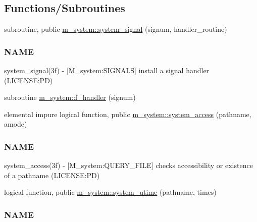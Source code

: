\subsection*{Functions/\+Subroutines}
\begin{DoxyCompactItemize}
\item 
subroutine, public \mbox{\hyperlink{namespacem__system_a4a70cade424b9763dedd8cb8c0059e8c}{m\+\_\+system\+::system\+\_\+signal}} (signum, handler\+\_\+routine)
\begin{DoxyCompactList}\small\item\em \subsubsection*{N\+A\+ME}

system\+\_\+signal(3f) -\/ \mbox{[}M\+\_\+system\+:S\+I\+G\+N\+A\+LS\mbox{]} install a signal handler (L\+I\+C\+E\+N\+SE\+:PD) \end{DoxyCompactList}\item 
subroutine \mbox{\hyperlink{namespacem__system_a078c9adfb12b36e88534248e99ed9fcc}{m\+\_\+system\+::f\+\_\+handler}} (signum)
\item 
elemental impure logical function, public \mbox{\hyperlink{namespacem__system_a4c1c906730e61629a8277e1daeda90f6}{m\+\_\+system\+::system\+\_\+access}} (pathname, amode)
\begin{DoxyCompactList}\small\item\em \subsubsection*{N\+A\+ME}

system\+\_\+access(3f) -\/ \mbox{[}M\+\_\+system\+:Q\+U\+E\+R\+Y\+\_\+\+F\+I\+LE\mbox{]} checks accessibility or existence of a pathname (L\+I\+C\+E\+N\+SE\+:PD) \end{DoxyCompactList}\item 
logical function, public \mbox{\hyperlink{namespacem__system_a83a121ba0b525210b5217565569ef350}{m\+\_\+system\+::system\+\_\+utime}} (pathname, times)
\begin{DoxyCompactList}\small\item\em \subsubsection*{N\+A\+ME}


\end{DoxyCompactList}
\end{DoxyCompactItemize}

